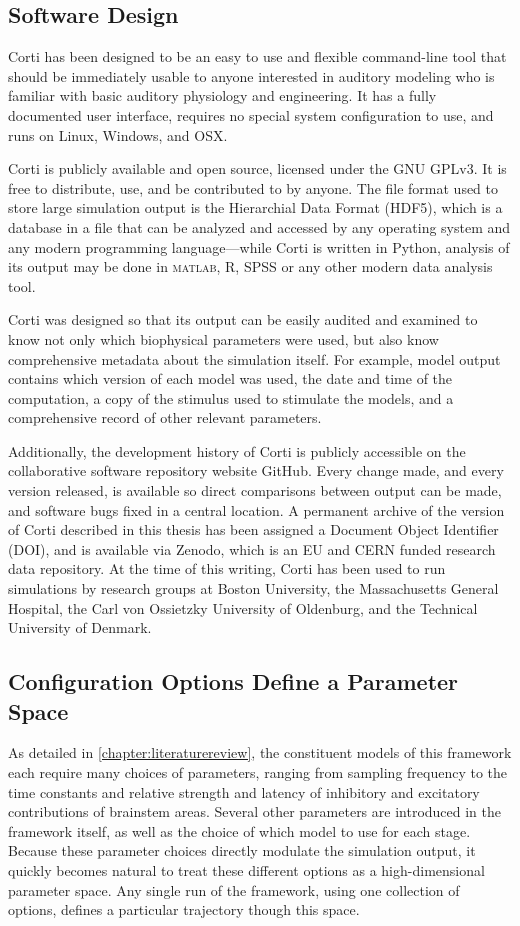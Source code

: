 \subsection{Software Design} %
\label{sub:software_design}
Corti has been designed to be an easy to use and flexible command-line tool that should be immediately usable to anyone interested in auditory modeling who is familiar with basic auditory physiology and engineering.  It has a fully documented user interface, requires no special system configuration to use, and runs on Linux, Windows, and OSX.

Corti is publicly available and open source, licensed under the GNU GPLv3.  It is free to distribute, use, and be contributed to by anyone.  The file format used to store large simulation output is the Hierarchial Data Format (HDF5), which is a database in a file that can be analyzed and accessed by any operating system and any modern programming language---while Corti is written in Python, analysis of its output may be done in \textsc{matlab}, R, SPSS or any other modern data analysis tool.

Corti was designed so that its output can be easily audited and examined to know not only which biophysical parameters were used, but also know comprehensive metadata about the simulation itself.  For example, model output contains which version of each model was used, the date and time of the computation, a copy of the stimulus used to stimulate the models, and a comprehensive record of other relevant parameters. 

Additionally, the development history of Corti is publicly accessible on the collaborative software repository website GitHub.  Every change made, and every version released, is available so direct comparisons between output can be made, and software bugs fixed in a central location.  A permanent archive of the version of Corti described in this thesis has been assigned a Document Object Identifier (DOI), and is available via Zenodo, which is an EU and CERN funded research data repository.  At the time of this writing, Corti has been used to run simulations by research groups at Boston University, the Massachusetts General Hospital, the Carl von Ossietzky University of Oldenburg, and the Technical University of Denmark.  

\subsection{Configuration Options Define a Parameter Space}
As detailed in \autoref{chapter:literaturereview}, the constituent models of this framework each require many choices of parameters, ranging from sampling frequency to the time constants and relative strength and latency of inhibitory and excitatory contributions of brainstem areas. Several other parameters are introduced in the framework itself, as well as the choice of which model to use for each stage. Because these parameter choices directly modulate the simulation output, it quickly becomes natural to treat these different options as a high-dimensional parameter space.  Any single run of the framework, using one collection of options, defines a particular trajectory though this space.

